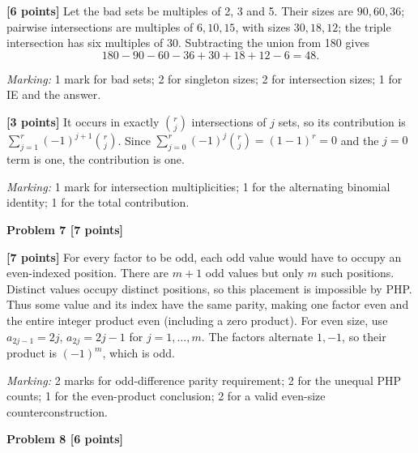 \documentclass[12pt,letterpaper]{article}
\newcommand{\problemheading}[2][5\baselineskip]{\Needspace{#1}\par\noindent\hspace*{-0.625in}\textbf{#2}\par\nobreak\vspace{0.3em}}
\begin{document}
\begin{description}[font=\normalfont,leftmargin=1.2em,labelsep=0.4em]
\item[(a)] \textbf{[6 points]} Let the bad sets be multiples of 2, 3 and 5. Their sizes are $90,60,36$; pairwise intersections are multiples of $6,10,15$, with sizes $30,18,12$; the triple intersection has six multiples of 30. Subtracting the union from 180 gives\[180-90-60-36+30+18+12-6=48.\]
\par\textit{Marking:} 1 mark for bad sets; 2 for singleton sizes; 2 for intersection sizes; 1 for IE and the answer.
\item[(b)] \textbf{[3 points]} It occurs in exactly $\binom rj$ intersections of $j$ sets, so its contribution is $\sum_{j=1}^r(-1)^{j+1}\binom rj$. Since $\sum_{j=0}^r(-1)^j\binom rj=(1-1)^r=0$ and the $j=0$ term is one, the contribution is one.
\par\textit{Marking:} 1 mark for intersection multiplicities; 1 for the alternating binomial identity; 1 for the total contribution.
\end{description}
\vspace{0.65em}
\problemheading[\dimexpr 3\baselineskip+4\baselineskip\relax]{Problem 7 [7 points]}
\begin{description}[font=\normalfont,leftmargin=1.2em,labelsep=0.4em]
\item[] \textbf{[7 points]} For every factor to be odd, each odd value would have to occupy an even-indexed position. There are $m+1$ odd values but only $m$ such positions. Distinct values occupy distinct positions, so this placement is impossible by PHP. Thus some value and its index have the same parity, making one factor even and the entire integer product even (including a zero product). For even size, use $a_{2j-1}=2j$, $a_{2j}=2j-1$ for $j=1,\ldots,m$. The factors alternate $1,-1$, so their product is $(-1)^m$, which is odd.
\par\textit{Marking:} 2 marks for odd-difference parity requirement; 2 for the unequal PHP counts; 1 for the even-product conclusion; 2 for a valid even-size counterconstruction.
\end{description}
\vspace{0.65em}
\problemheading[\dimexpr 3\baselineskip+4\baselineskip\relax]{Problem 8 [6 points]}
\end{document}
